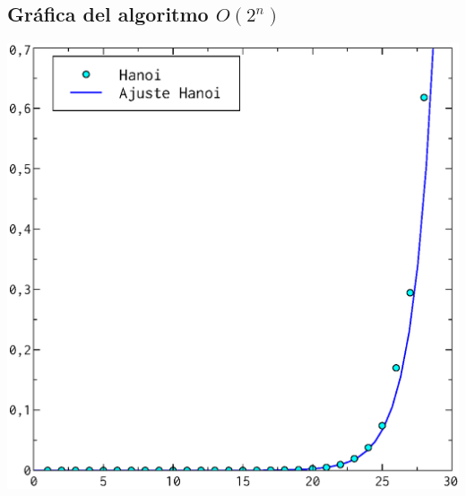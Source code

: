 \documentclass[a4paper, 11pt]{article}
\begin{document}
\subsection{Gráfica del algoritmo $O(2^n)$}
 \includegraphics[]{2n_ajuste.eps}
 
 
 
 
\end{document}
